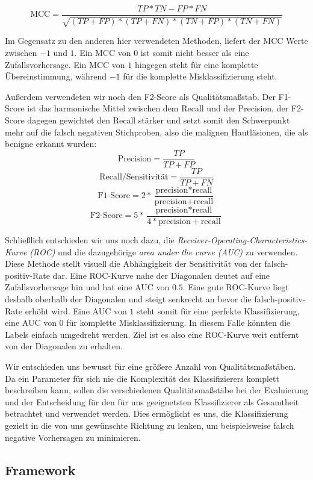 \[\text{MCC} = \frac{TP*TN - FP*FN}{\sqrt{(TP+FP)*(TP+FN)*(TN+FP)*(TN+FN)}}\]

Im Gegensatz zu den anderen hier verwendeten Methoden, liefert der MCC Werte zwischen $-1$ und $1$. Ein MCC von $0$ ist somit nicht besser als eine Zufallsvorhersage. Ein MCC von $1$ hingegen steht für eine komplette Übereinstimmung, während $-1$ für die komplette Misklassifizierung steht.

Außerdem verwendeten wir noch den F2-Score als Qualitätsmaßstab. Der F1-Score ist das harmonische Mittel zwischen dem Recall und der Precision, der F2-Score dagegen gewichtet den Recall stärker und setzt somit den Schwerpunkt mehr auf die falsch negativen Stichproben, also die malignen Hautläsionen, die als benigne erkannt wurden:
	\[\text{Precision} = \frac{TP}{TP+FP}\]
    \[\text{Recall/Sensitivität} = \frac{TP}{TP+FN}\]
	\[\text{F1-Score} = 2*\frac{\text{precision}*\text{recall}}	{\text{precision}+\text{recall}}\]
   	\[\text{F2-Score} = 5*\frac{\text{precision}*\text{recall}}	{4*\text{precision}+\text{recall}}\]
    
Schließlich entschieden wir uns noch dazu, die \textit{Receiver-Operating-Characteristics-Kurve (ROC)} und die dazugehörige \textit{area under the curve (AUC)} zu verwenden. Diese Methode stellt visuell die Abhängigkeit der Sensitivität von der falsch-positiv-Rate dar. Eine ROC-Kurve nahe der Diagonalen deutet auf eine Zufallsvorhersage hin und hat eine AUC von $0.5$. Eine gute ROC-Kurve liegt deshalb oberhalb der Diagonalen und steigt senkrecht an bevor die falsch-positiv-Rate erhöht wird. Eine AUC von $1$ steht somit für eine perfekte Klassifizierung, eine AUC von $0$ für komplette Misklassifizierung. In diesem Falle könnten die Labels einfach umgedreht werden. Ziel ist es also eine ROC-Kurve weit entfernt von der Diagonalen zu erhalten.
    
Wir entschieden uns bewusst für eine größere Anzahl von Qualitätsmaßstäben. Da ein Parameter für sich nie die Komplexität des Klassifizierers komplett beschreiben kann, sollen die verschiedenen Qualitätsmaßstäbe bei der Evaluierung und der Entscheidung für den für uns geeignetsten Klassifizierer als Gesamtheit betrachtet und verwendet werden. Dies ermöglicht es uns, die Klassifizierung gezielt in die von uns gewünschte Richtung zu lenken, um beispielsweise falsch negative Vorhersagen zu minimieren.

\subsection{Framework}

